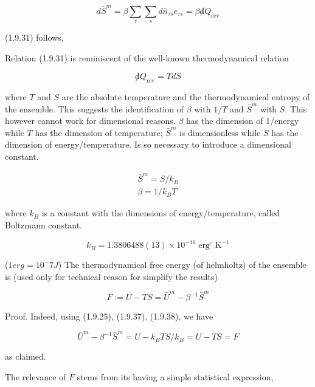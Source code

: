 \documentclass{article}
\begin{document}
\begin{equation*}
d \bar{S}^{m}=\beta \sum_{\tau} \sum_{s} d \bar{n}_{\tau s} e_{\tau s}=\beta \not d Q_{\mathrm{rev}} \tag{1.9.35}
\end{equation*}
 
(1.9.31) follows.

Relation (1.9.31) is reminiscent of the well-known thermodynamical relation

\begin{equation}
\not d Q_{\mathrm{rev}}=T d S \tag{1.9.36}
\end{equation}

where $T$ and $S$ are the absolute temperature and the thermodynamical entropy of the ensemble. This suggests the identification of $\beta$ with $1 / T$ and $\bar{S}^{m}$ with $S$. This however cannot work for dimensional reasons. $\beta$ has the dimension of 1/energy while $T$ has the dimension of temperature; $\bar{S}^{m}$ is dimensionless while $S$ has the dimension of energy/temperature. Is so necessary to introduce a dimensional constant.

\begin{gather*}
\bar{S}^{m}=S / k_{B}  \tag{1.9.37}\\
\beta=1 / k_{B} T \tag{1.9.38}
\end{gather*}

where $k_{B}$ is a constant with the dimensions of energy/temperature, called Boltzmann constant.

\begin{equation*}
k_{B}=1.3806488(13) \times 10^{-16} \operatorname{erg}^{\circ} \mathrm{K}^{-1} \tag{1.9.39}
\end{equation*}

($1 erg= 10^-7J$)
The thermodynamical free energy (of helmholtz) of the ensemble is (used only for technical reason for simplify the results)

\begin{equation*}
F:=U-T S=\bar{U}^{m}-\beta^{-1} \bar{S}^{m} \tag{1.9.40}
\end{equation*}


Proof. Indeed, using (1.9.25), (1.9.37), (1.9.38), we have

\begin{equation*}
\bar{U}^{m}-\beta^{-1} \bar{S}^{m}=U-k_{B} T S / k_{B}=U-T S=F \tag{1.9.41}
\end{equation*}

as claimed.

The relevance of $F$ stems from its having a simple statistical expression,
\end{document}
